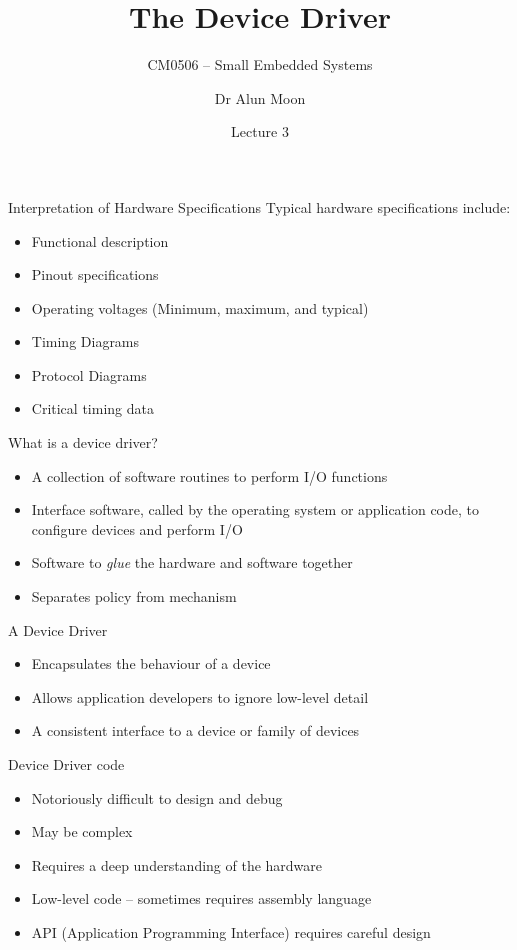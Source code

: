 \documentclass[svgnames,x11names]{beamer}
\title{The Device Driver}
\subtitle{CM0506 -- Small Embedded Systems}
\date{Lecture 3}
\author{Dr Alun Moon}
\institute[CIS]{Department of Computer and Information Science}
\begin{document}
\frame\maketitle

\begin{frame}{Interpretation of Hardware Specifications}
Typical hardware specifications include:
\begin{itemize}
\item Functional description
\item Pinout specifications
\item Operating voltages (Minimum, maximum, and typical)
\item Timing Diagrams
\item Protocol Diagrams
\item Critical timing data
\end{itemize}
\end{frame}

\begin{frame}{What is a \alert{device driver}?}
  \begin{itemize}
  \item A collection of software routines to perform I/O functions
  \item Interface software, called by the operating system or
    application code, to configure devices and perform I/O
  \item Software to \emph{glue} the hardware and software together
  \item Separates policy from mechanism
  \end{itemize}
\end{frame}

\begin{frame}{A Device Driver}
  \begin{itemize}
  \item Encapsulates the behaviour of a device
  \item Allows application developers to ignore low-level detail
  \item A consistent interface to a device or family of devices
  \end{itemize}
\end{frame}

\begin{frame}{Device Driver code}
  \begin{itemize}
  \item Notoriously difficult to design and debug
  \item May be complex
  \item Requires a deep understanding of the hardware
  \item Low-level code -- sometimes requires assembly language
  \item API (Application Programming Interface) requires careful design
  \end{itemize}
\end{frame}
\end{document}
